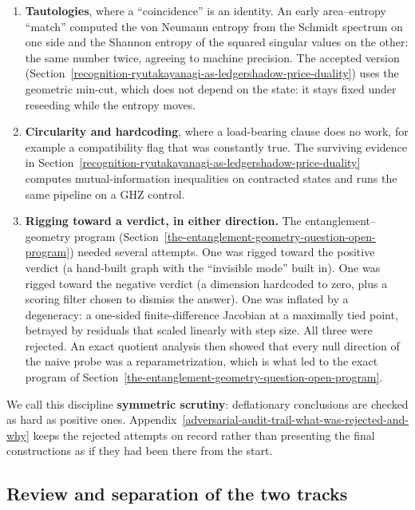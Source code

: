\begin{enumerate}\tightlist
\item \textbf{Tautologies}, where a ``coincidence'' is an identity. An early area--entropy ``match'' computed the von
  Neumann entropy from the Schmidt spectrum on one side and the Shannon entropy of the squared singular values on the
  other: the same number twice, agreeing to machine precision. The accepted version
  (Section~\ref{recognition-ryutakayanagi-as-ledgershadow-price-duality}) uses the geometric min-cut, which does not
  depend on the state: it stays fixed under reseeding while the entropy moves.
\item \textbf{Circularity and hardcoding}, where a load-bearing clause does no work, for example a compatibility flag
  that was constantly true. The surviving evidence in Section~\ref{recognition-ryutakayanagi-as-ledgershadow-price-duality}
  computes mutual-information inequalities on contracted states and runs the same pipeline on a GHZ control.
\item \textbf{Rigging toward a verdict, in either direction.} The entanglement--geometry program
  (Section~\ref{the-entanglement-geometry-question-open-program}) needed several attempts. One was rigged toward the
  positive verdict (a hand-built graph with the ``invisible mode'' built in). One was rigged toward the negative verdict
  (a dimension hardcoded to zero, plus a scoring filter chosen to dismiss the answer). One was inflated by a degeneracy:
  a one-sided finite-difference Jacobian at a maximally tied point, betrayed by residuals that scaled linearly with
  step size. All three were rejected. An exact quotient analysis then showed that every null direction of the naive
  probe was a reparametrization, which is what led to the exact program of Section~\ref{the-entanglement-geometry-question-open-program}.
\end{enumerate}

We call this discipline \textbf{symmetric scrutiny}: deflationary conclusions are checked as hard as positive ones.
Appendix~\ref{adversarial-audit-trail-what-was-rejected-and-why} keeps the rejected attempts on record rather than
presenting the final constructions as if they had been there from the start.

\subsection{Review and separation of the two tracks}\label{adversarial-review-and-the-anti-contamination-guard}

